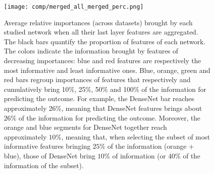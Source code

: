 \begin{figure}
    \centering
    \texttt{[image: comp/merged\_all\_merged\_perc.png]}
    \caption{Average relative importances (across datasets) brought by each studied network when all their last layer features are aggregated. The black bars quantify the proportion of features of each network. The colors indicate the information brought by features of decreasing importances: blue and red features are respectively the most informative and least informative ones. Blue, orange, green and red bars regroup importances of features that respectively and cumulatively bring 10\%, 25\%, 50\% and 100\% of the information for predicting the outcome. For example, the DenseNet bar  reaches approximately $26\%$, meaning that DenseNet features brings about $26\%$ of the information for predicting the outcome. Moreover, the orange and blue segments for DenseNet together reach approximately $10\%$, meaning that, when selecting the subset of most informative features bringing $25\%$ of the information (orange + blue), those of DenseNet bring $10\%$ of information (or $40\%$ of the information of the subset).}
    \label{fig:comp:models_merged_avg_imp}
\end{figure} 


